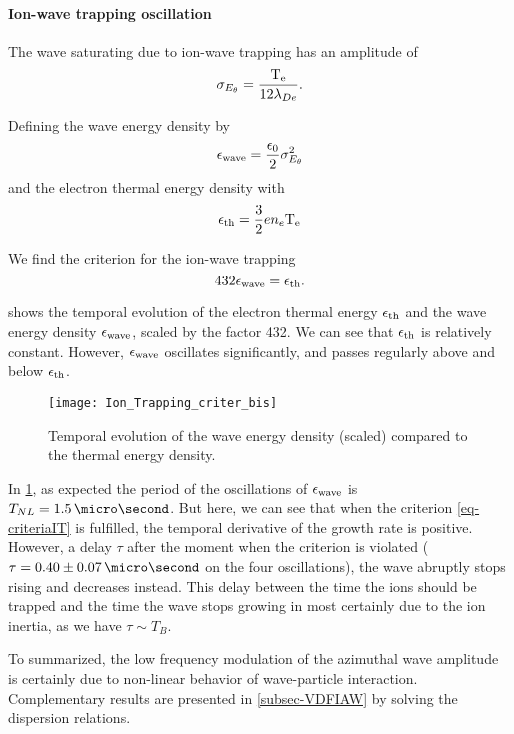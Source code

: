   
  \paragraph{Ion-wave trapping oscillation\\}
    The wave saturating due to ion-wave trapping has an amplitude of \citep{lafleur2017,boeuf2018}
     \begin{equation} \label{eq-iontropempl}
       \sigma_{E_{\theta}} = \frac{\mathrm{T_e}}{12 \lambda_{De}}.
     \end{equation}
    
    Defining the wave energy  density by
    \begin{equation} \label{eq-waveE}
      \epsilon_{\rm wave} = \frac{\epsilon_0}{2} \sigma_{E_{\theta}}^2
    \end{equation}
    and the electron thermal energy density with
    \begin{equation} \label{eq-thE}
      \epsilon_{\rm th} = \frac{3}{2} e n_e \mathrm{T_e}
    \end{equation}
    
    We find the criterion for the ion-wave trapping
    \begin{equation} \label{eq-criteriaIT}
      432 \epsilon_{\rm wave} = \epsilon_{\rm th}.
    \end{equation}
    
     shows the temporal evolution of the electron thermal energy $\epsilon_{\rm th}$ and the wave energy density $\epsilon_{\rm wave}$, scaled by the factor 432.
    We can see that $\epsilon_{\rm th}$ is relatively constant.
    However, $\epsilon_{\rm wave}$  oscillates significantly, and passes regularly above and below $\epsilon_{\rm th}$.
    
    \begin{figure}[!hbt]
      \centering
      \texttt{[image: Ion\_Trapping\_criter\_bis]}
      \caption{Temporal evolution of the wave energy density (scaled) compared to the thermal energy density.}
      \label{fig-tempITcrit}
    \end{figure}
    
    In \cref{fig-tempITcrit}, as expected the period of the oscillations of $\epsilon_{\rm wave}$ is $T_{NL} = 1.5\,\micro\second$.
    But here, we can see that when the criterion \cref{eq-criteriaIT} is fulfilled, the temporal derivative of the growth rate is positive.
    However, a delay $\tau$ after the moment when the criterion is violated ($\tau = 0.40 \pm 0.07 \,\micro\second$ on the four oscillations), the wave abruptly stops rising and decreases instead.
    This delay between the time the ions should be trapped and the time the wave stops growing in most certainly due to the ion inertia, as we have $\tau \sim T_B$.
    
    To summarized, the low frequency modulation of the azimuthal wave amplitude is certainly due to non-linear behavior of wave-particle interaction.
    Complementary results are presented in \cref{subsec-VDFIAW} by solving the dispersion relations.
    
